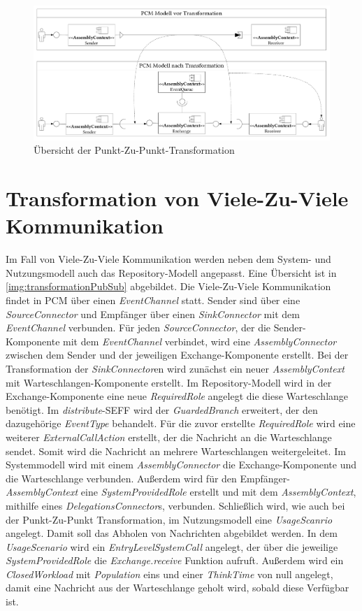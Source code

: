 \begin{figure}
\center
  \includegraphics[width=1.3\textwidth, angle=90]{images/transformation/transformationSystemP2P.pdf}
  \caption{Übersicht der Punkt-Zu-Punkt-Transformation}
  \label{img:transformationP2P}
\end{figure}

\section{Transformation von Viele-Zu-Viele Kommunikation}
Im Fall von Viele-Zu-Viele Kommunikation werden neben dem System- und Nutzungsmodell auch das Repository-Modell angepasst. Eine Übersicht ist in \autoref{img:transformationPubSub} abgebildet. Die Viele-Zu-Viele Kommunikation findet in PCM über einen \emph{EventChannel} statt. Sender sind über eine \emph{SourceConnector} und Empfänger über einen \emph{SinkConnector} mit dem \emph{EventChannel} verbunden. Für jeden \emph{SourceConnector}, der die Sender-Komponente mit dem \emph{EventChannel} verbindet, wird eine \emph{AssemblyConnector} zwischen dem Sender und der jeweiligen Exchange-Komponente erstellt. Bei der Transformation der \emph{SinkConnector}en wird zunächst ein neuer \emph{AssemblyContext} mit Warteschlangen-Komponente erstellt. Im Repository-Modell wird in der Exchange-Komponente eine neue \emph{RequiredRole} angelegt die diese Warteschlange benötigt. Im \emph{distribute}-SEFF wird der \emph{GuardedBranch} erweitert, der den dazugehörige \emph{EventType} behandelt. Für die zuvor erstellte \emph{RequiredRole} wird eine weiterer \emph{ExternalCallAction} erstellt, der die Nachricht an die Warteschlange sendet. Somit wird die Nachricht an mehrere Warteschlangen weitergeleitet. Im Systemmodell wird mit einem \emph{AssemblyConnector} die Exchange-Komponente und die Warteschlange verbunden. Außerdem wird für den Empfänger-\emph{AssemblyContext} eine \emph{SystemProvidedRole} erstellt und mit dem \emph{AssemblyContext}, mithilfe eines \emph{DelegationsConnector}s, verbunden. Schließlich wird, wie auch bei der Punkt-Zu-Punkt Transformation, im Nutzungsmodell eine \emph{UsageScanrio} angelegt. Damit soll das Abholen von Nachrichten abgebildet werden. In dem \emph{UsageScenario} wird ein \emph{EntryLevelSystemCall} angelegt, der über die jeweilige \emph{SystemProvidedRole} die \emph{Exchange.receive} Funktion aufruft. Außerdem wird ein \emph{ClosedWorkload} mit \emph{Population} eins und einer \emph{ThinkTime} von null angelegt, damit eine Nachricht aus der Warteschlange geholt wird, sobald diese Verfügbar ist.

